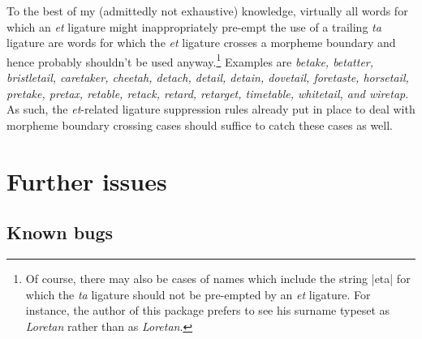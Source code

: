 \documentclass[11pt]{article}
\begin{document}
	To the best of my (admittedly not exhaustive) knowledge, virtually all words for which an \emph{et} ligature might inappropriately pre-empt the use of a trailing \emph{ta} ligature are words for which the \emph{et} ligature crosses a morpheme boundary and hence probably shouldn't be used anyway.\footnote{Of course, there may also be cases of names which include the string |eta| for which the \emph{ta} ligature should not be pre-empted by an \emph{et} ligature. For instance, the author of this package prefers to see his surname typeset as \emph{Loretan} rather than as \emph{Loretan}.} Examples are \emph{betake, betatter, bristletail, caretaker, cheetah, detach, detail, detain, dovetail, foretaste, horsetail, pretake, pretax, retable, retack, retard, retarget, timetable, whitetail, \emph{and} wiretap}. As such, the \emph{et}-related ligature suppression rules already put in place to deal with morpheme boundary crossing cases should suffice to catch these cases as well.




\section{Further issues}

\subsection{Known bugs}
\end{document}
